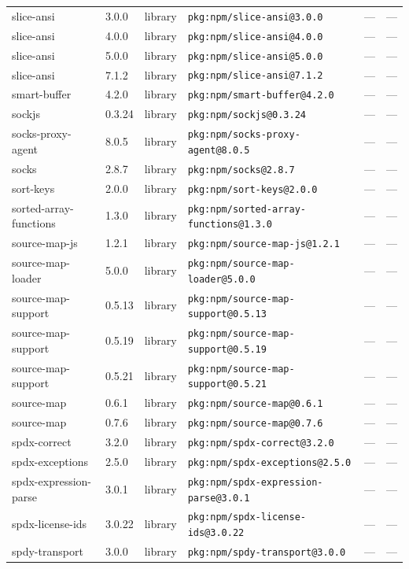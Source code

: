 \documentclass[11pt]{article}
\begin{document}
\begin{longtable}{|l|l|l|p{2.2cm}|l|p{4cm}|}
slice-ansi & 3.0.0 & library & \texttt{pkg:npm/slice-ansi@3.0.0} & — & — \\
slice-ansi & 4.0.0 & library & \texttt{pkg:npm/slice-ansi@4.0.0} & — & — \\
slice-ansi & 5.0.0 & library & \texttt{pkg:npm/slice-ansi@5.0.0} & — & — \\
slice-ansi & 7.1.2 & library & \texttt{pkg:npm/slice-ansi@7.1.2} & — & — \\
smart-buffer & 4.2.0 & library & \texttt{pkg:npm/smart-buffer@4.2.0} & — & — \\
sockjs & 0.3.24 & library & \texttt{pkg:npm/sockjs@0.3.24} & — & — \\
socks-proxy-agent & 8.0.5 & library & \texttt{pkg:npm/socks-proxy-agent@8.0.5} & — & — \\
socks & 2.8.7 & library & \texttt{pkg:npm/socks@2.8.7} & — & — \\
sort-keys & 2.0.0 & library & \texttt{pkg:npm/sort-keys@2.0.0} & — & — \\
sorted-array-functions & 1.3.0 & library & \texttt{pkg:npm/sorted-array-functions@1.3.0} & — & — \\
source-map-js & 1.2.1 & library & \texttt{pkg:npm/source-map-js@1.2.1} & — & — \\
source-map-loader & 5.0.0 & library & \texttt{pkg:npm/source-map-loader@5.0.0} & — & — \\
source-map-support & 0.5.13 & library & \texttt{pkg:npm/source-map-support@0.5.13} & — & — \\
source-map-support & 0.5.19 & library & \texttt{pkg:npm/source-map-support@0.5.19} & — & — \\
source-map-support & 0.5.21 & library & \texttt{pkg:npm/source-map-support@0.5.21} & — & — \\
source-map & 0.6.1 & library & \texttt{pkg:npm/source-map@0.6.1} & — & — \\
source-map & 0.7.6 & library & \texttt{pkg:npm/source-map@0.7.6} & — & — \\
spdx-correct & 3.2.0 & library & \texttt{pkg:npm/spdx-correct@3.2.0} & — & — \\
spdx-exceptions & 2.5.0 & library & \texttt{pkg:npm/spdx-exceptions@2.5.0} & — & — \\
spdx-expression-parse & 3.0.1 & library & \texttt{pkg:npm/spdx-expression-parse@3.0.1} & — & — \\
spdx-license-ids & 3.0.22 & library & \texttt{pkg:npm/spdx-license-ids@3.0.22} & — & — \\
spdy-transport & 3.0.0 & library & \texttt{pkg:npm/spdy-transport@3.0.0} & — & — \\

\end{longtable}
\end{document}
